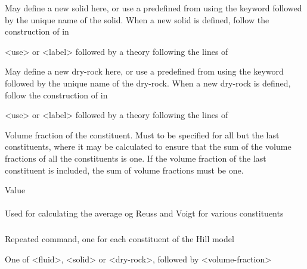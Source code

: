 {
 \slist
   \item \Description May define a new solid here, or use a predefined  from  using the keyword  followed by the unique name of the solid. When a new solid is defined, follow the construction of  in 
   \item \Argument <use> or <label> followed by a theory following the lines of 
   \item \Default
 \elist

 \slist
   \item \Description  May define a new dry-rock here, or use a predefined  from  using the keyword  followed by the unique name of the dry-rock. When a new dry-rock is defined, follow the construction of  in 
   \item \Argument <use> or <label> followed by a theory following the lines of 
   \item \Default
 \elist

 \slist
   \item \Description Volume fraction of the constituent. Must to be specified for all but the last constituents, where it may be calculated to ensure that the sum of the volume fractions of all the constituents is one. If the volume fraction of the last constituent is included, the sum of volume fractions must be one.
   \item \Argument Value
   \item \Default
 \elist

\paragraph{}
 \slist
   \item \Description Used for calculating the average og Reuss and Voigt for various constituents
   \item \Argument
   \item \Default
 \elist

\subparagraph{}
 \slist
   \item \Description Repeated command, one for each constituent of the Hill model
   \item \Argument One of <fluid>, <solid> or <dry-rock>, followed by <volume-fraction>
   \item \Default
 \elist

}
